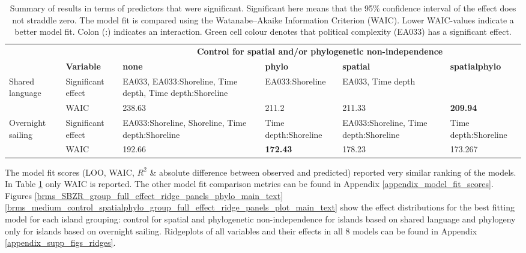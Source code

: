 \documentclass[unnumsec,webpdf,modern,medium]{oup-authoring-template}
\begin{document}
\begin{table}[ht]
\centering
\begin{tabular}{p{2cm}p{1.8cm}|p{2.4cm}p{2.4cm}p{2.4cm}p{2cm}}
  \toprule
&&  \multicolumn{4}{c}{\textbf{Control for spatial and/or phylogenetic non-independence}}\linebreak\\
 & \textbf{	Variable	} & \textbf{	none	} & \textbf{	phylo	} & \textbf{	spatial	} & \textbf{	spatialphylo	} 	\\
\midrule
\multirow{2}{*}{Shared language}
 	&	Significant effect	&	\cellcolor{spec_color_lightgreen!50} EA033, EA033:Shoreline, Time depth, Time depth:Shoreline	&	\cellcolor{spec_color_lightgreen!50} EA033:Shoreline	&	\cellcolor{spec_color_lightgreen!50} EA033, Time depth &		\\
		&	WAIC	&	238.63	&	211.2	&	211.33	&	 \textbf{209.94}	\\
  \midrule
\multirow{2}{*}{Overnight sailing}	&	Significant effect	&	\cellcolor{spec_color_lightgreen!50} EA033:Shoreline, Shoreline, Time depth:Shoreline	&	Time depth:Shoreline	&	\cellcolor{spec_color_lightgreen!50} EA033:Shoreline, Time depth:Shoreline &	Time depth:Shoreline		\\
	&	WAIC	&	192.66	&	\textbf{172.43}	&	178.23&	173.267		\\

   \bottomrule
\end{tabular}
\caption{Summary of results in terms of predictors that were significant. Significant here means that the 95\% confidence interval of the effect does not straddle zero. The model fit is compared using the Watanabe–Akaike Information Criterion (WAIC). Lower WAIC-values indicate a better model fit. Colon (:) indicates an interaction. Green cell colour denotes that political complexity (EA033) has a significant effect. } 
\label{brms_results_summary}
\end{table}


The model fit scores (LOO, WAIC, $R^2$ \& absolute difference between observed and predicted) reported very similar ranking of the models. In Table \ref{brms_results_summary} only WAIC is reported. The other model fit comparison metrics can be found in Appendix \ref{appendix_model_fit_scores}. Figures \ref{brms_SBZR_group_full_effect_ridge_panels_phylo_main_text}
\ref{brms_medium_control_spatialphylo_group_full_effect_ridge_panels_plot_main_text} show the effect distributions for the best fitting model for each island grouping: control for spatial and phylogenetic non-independence for islands based on shared language and phylogeny only for islands based on overnight sailing. Ridgeplots of all variables and their effects in all 8 models can be found in Appendix \ref{appendix_supp_figs_ridges}. 
\end{document}
